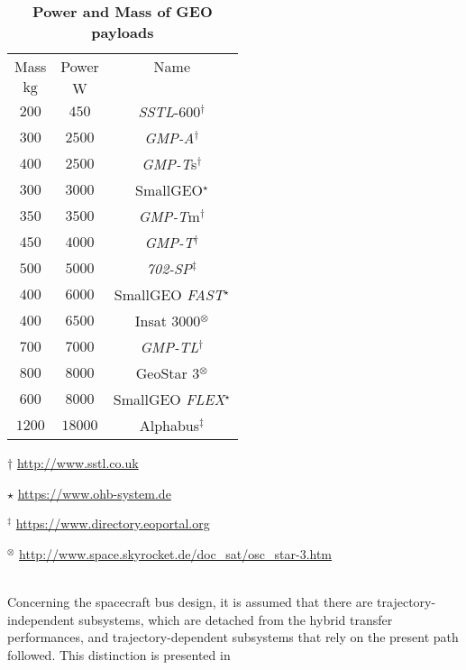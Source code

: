 \begin{table}[htp]
\footnotesize
\centering
\caption{\textbf{Power and Mass of GEO payloads}}
\label{tab:masspower}
\begin{threeparttable}
\begin{tabular}{ccc}
\toprule
\toprule
Mass&Power&Name\\
$\si{\kilo\gram}$&$\si{\watt}$&\\
\midrule
$200$&$450$& \textit{SSTL}-600$^{\dagger}$\\
$300$&$2500$&\textit{GMP-A}$^{\dagger}$\\
$400$&$2500$&\textit{GMP-T}s$^{\dagger}$\\
$300$&$3000$&SmallGEO$^{\star}$\\
$350$&$3500$&\textit{GMP-T}m$^{\dagger}$\\
$450$&$4000$&\textit{GMP-T}$^{\dagger}$\\
$500$&$5000$&\textit{702-SP}$^{\ddagger}$\\
$400$&$6000$&SmallGEO \textit{FAST}$^{\star}$\\
$400$&$6500$&Insat 3000$^{\otimes}$\\
$700$&$7000$&\textit{GMP-TL}$^{\dagger}$\\
$800$&$8000$&GeoStar 3$^{\otimes}$\\
$600$&$8000$&SmallGEO \textit{FLEX}$^{\star}$\\
$1200$&$18000$& Alphabus$^{\ddagger}$\\
\bottomrule      
\bottomrule  
\end{tabular}
\begin{tablenotes}
\footnotesize
\item[$\dagger$]\url{http://www.sstl.co.uk}
\item[$\star$]\url{https://www.ohb-system.de}
\item[$^{\ddagger}$]\url{https://www.directory.eoportal.org}
\item[$^{\otimes}$]\url{http://www.space.skyrocket.de/doc_sat/osc_star-3.htm}
\end{tablenotes}
\end{threeparttable}
\end{table}
%
\\Concerning the spacecraft bus design, it is assumed that there are trajectory-independent subsystems, which are detached from the hybrid transfer performances, and trajectory-dependent subsystems that rely on the present path followed.
This distinction is presented in 
